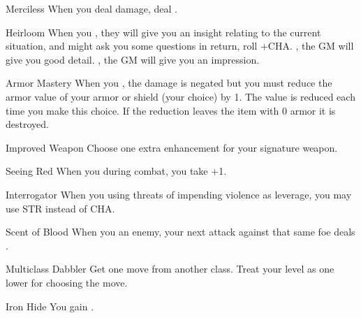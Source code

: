 \documentclass[8pt]{extarticle}
\begin{document}
\begin{multicols}{2}
\firstAdvances

\begin{amove}{Merciless}
  When you deal damage, deal .
\end{amove}

\begin{amove}{Heirloom}
  When you , they will give you an insight relating to the
  current situation, and might ask you some questions in return,
  roll +CHA. \onSuccess, the GM will give you good detail. \onPartial,
  the GM will give you an impression.
\end{amove}

\begin{amove}{Armor Mastery}
  When you , the damage is negated but you must reduce the armor value
  of your armor or shield (your choice) by 1. The value is reduced
  each time you make this choice. If the reduction leaves the item
  with 0 armor it is destroyed.
\end{amove}

\begin{amove}{Improved Weapon}
  Choose one extra enhancement for your signature weapon.
\end{amove}

\begin{amove}{Seeing Red}
  When you  during combat, you take +1.
\end{amove}

\begin{amove}{Interrogator}
  When you  using threats of impending violence as
  leverage, you may use STR instead of CHA.
\end{amove}

\begin{amove}{Scent of Blood}
  When you  an enemy, your next attack against
  that same foe deals .
\end{amove}

\begin{amove}{Multiclass Dabbler}
  Get one move from another class. Treat your level as one lower for
  choosing the move.
\end{amove}

\begin{amove}{Iron Hide}
  You gain .
\end{amove}


\end{multicols}
\end{document}
